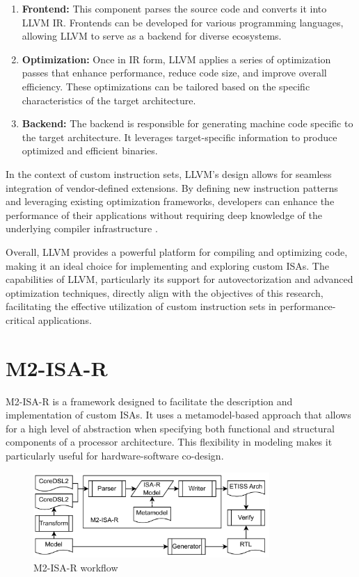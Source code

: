\begin{enumerate}
    \item \textbf{Frontend:} This component parses the source code and converts it into LLVM IR. Frontends can be developed for various programming languages, allowing LLVM to serve as a backend for diverse ecosystems.

    \item \textbf{Optimization:} Once in IR form, LLVM applies a series of optimization passes that enhance performance, reduce code size, and improve overall efficiency. These optimizations can be tailored based on the specific characteristics of the target architecture.

    \item \textbf{Backend:} The backend is responsible for generating machine code specific to the target architecture. It leverages target-specific information to produce optimized and efficient binaries.
\end{enumerate}

In the context of custom instruction sets, LLVM's design allows for seamless integration of vendor-defined extensions. By defining new instruction patterns and leveraging existing optimization frameworks, developers can enhance the performance of their applications without requiring deep knowledge of the underlying compiler infrastructure \cite{llvm}.

Overall, LLVM provides a powerful platform for compiling and optimizing code, making it an ideal choice for implementing and exploring custom ISAs. The capabilities of LLVM, particularly its support for autovectorization and advanced optimization techniques, directly align with the objectives of this research, facilitating the effective utilization of custom instruction sets in performance-critical applications.


\section{M2-ISA-R}
M2-ISA-R is a framework designed to facilitate the description and implementation of custom ISAs. It uses a metamodel-based approach that allows for a high level of abstraction when specifying both functional and structural components of a processor architecture. This flexibility in modeling makes it particularly useful for hardware-software co-design.

\begin{figure}
    \centering
    \includegraphics[width=0.8\textwidth]{figures/m2isar.png}
    \caption{M2-ISA-R workflow \cite{RISCVSimulation}}
    \label{fig:m2isar}
\end{figure}

